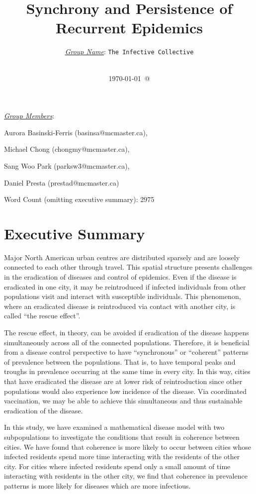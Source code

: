 \documentclass[12pt]{article}
\title{Synchrony and Persistence of Recurrent Epidemics}
\author{ \underline{\emph{Group Name}}: \texttt{{\color{blue}The Infective Collective}}\\
\\}
\date{\today\ @ \thistime}
\begin{document}
\vfill
\maketitle 
\noindent

\underline{\emph{Group Members}}:
\begin{itemize}
{\color{blue}
\item Aurora Basinski-Ferris (basinsa@mcmaster.ca), 
\item Michael Chong (chongmy@mcmaster.ca), 
\item Sang Woo Park (parksw3@mcmaster.ca), 
\item Daniel Presta (prestad@mcmaster.ca)}
\end{itemize}

\noindent
Word Count (omitting executive summary): 2975 

\vfill
\newpage 
\linenumbers

\section*{Executive Summary}
Major North American urban centres are distributed sparsely and are loosely connected to each other through travel. This spatial structure presents challenges in the eradication of diseases and control of epidemics. Even if the disease is eradicated in one city, it may be reintroduced if infected individuals from other populations visit and interact with susceptible individuals. This phenomenon, where an eradicated disease is reintroduced via contact with another city, is called “the rescue effect”.

The rescue effect, in theory, can be avoided if eradication of the disease happens simultaneously across all of the connected populations. Therefore, it is beneficial from a disease control perspective to have “synchronous” or “coherent” patterns of prevalence between the populations. That is, to have temporal peaks and troughs in prevalence occurring at the same time in every city. In this way, cities that have eradicated the disease are at lower risk of reintroduction since other populations would also experience low incidence of the disease. Via coordinated vaccination, we may be able to achieve this simultaneous and thus sustainable eradication of the disease.

In this study, we have examined a mathematical disease model with two subpopulations to investigate the conditions that result in coherence between cities. We have found that coherence is more likely to occur between cities whose infected residents spend more time interacting with the residents of the other city. For cities where infected residents spend only a small amount of time interacting with residents in the other city, we find that coherence in prevalence patterns is more likely for diseases which are more infectious. 
\end{document}
